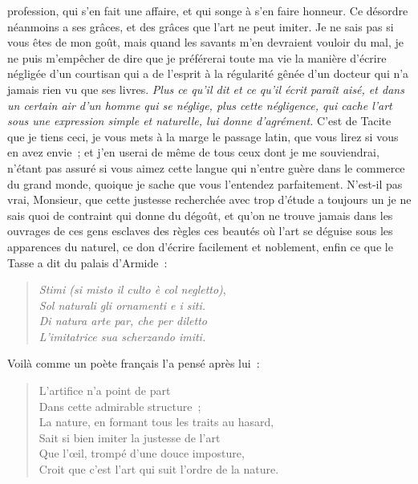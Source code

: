 \documentclass[french,twoside]{book} %
\begin{document}
profession, qui s’en fait une affaire, et qui songe à s’en faire honneur. Ce désordre néanmoins a ses grâces, et des grâces que l’art ne peut imiter. Je ne sais pas si vous êtes de mon goût, mais quand les savants m’en devraient vouloir du mal, je ne puis m’empêcher de dire que je préférerai toute ma vie la manière d’écrire négligée d’un courtisan qui a de l’esprit à la régularité gênée d’un docteur qui n’a jamais rien vu que ses livres. {\itshape Plus ce qu’il dit et ce qu’il écrit paraît aisé, et dans un certain air d’un homme qui se néglige, plus cette négligence, qui cache l’art sous une expression simple et naturelle, lui donne d’agrément.} C’est de Tacite que je tiens ceci, je vous mets à la marge le passage latin, que vous lirez si vous en avez envie ; et j’en userai de même de tous ceux dont je me souviendrai, n’étant pas assuré si vous aimez cette langue qui n’entre guère dans le commerce du grand monde, quoique je sache que vous l’entendez parfaitement. N’est-il pas vrai, Monsieur, que cette justesse recherchée avec trop d’étude a toujours un je ne sais quoi de contraint qui donne du dégoût, et qu’on ne trouve jamais dans les ouvrages de ces gens esclaves des règles ces beautés où l’art se déguise sous les apparences du naturel, ce don d’écrire facilement et noblement, enfin ce que le Tasse a dit du palais d’Armide :\par


\begin{verse}
{\itshape Stimi (si misto il culto è col negletto)}, \\
 {\itshape Sol naturali gli ornamenti e i siti.} \\
 {\itshape Di natura arte par, che per diletto} \\
 {\itshape L’imitatrice sua scherzando imiti.} \\
\end{verse}

\noindent Voilà comme un poète français l’a pensé après lui :\par


\begin{verse}
L’artifice n’a point de part\\
Dans cette admirable structure ;\\
La nature, en formant tous les traits au hasard,\\
Sait si bien imiter la justesse de l’art\\
Que l’œil, trompé d’une douce imposture,\\
Croit que c’est l’art qui suit l’ordre de la nature.\\
\end{verse}
\end{document}
